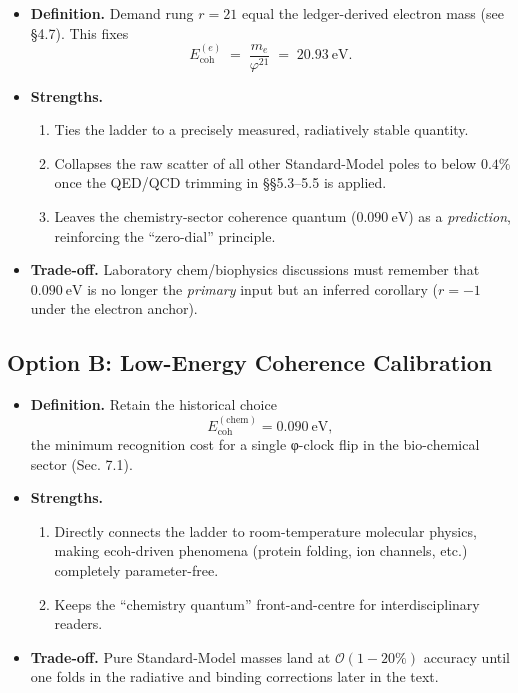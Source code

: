 \documentclass[11pt,oneside]{book}
\begin{document}
\begin{itemize}
\item \textbf{Definition.}  Demand rung $r=21$ equal the ledger-derived electron mass
      (see §4.7).  
      This fixes
      \[
        E_{\mathrm{coh}}^{(e)} \;=\;
        \frac{m_{e}}{\varphi^{21}} \;=\; 20.93\ \mathrm{eV}.
      \]
\item \textbf{Strengths.}  
  \begin{enumerate}
  \item Ties the ladder to a precisely measured, radiatively stable quantity.  
  \item Collapses the raw scatter of all other Standard-Model poles to below
        $0.4\%$ once the QED/QCD trimming in §§5.3–5.5 is applied.  
  \item Leaves the chemistry-sector coherence quantum ($0.090\ \mathrm{eV}$) as a
        \emph{prediction}, reinforcing the “zero-dial” principle.
  \end{enumerate}
\item \textbf{Trade-off.}  Laboratory chem/biophysics discussions must remember that
      $0.090\ \mathrm{eV}$ is no longer the \emph{primary} input but an inferred corollary
      ($r=-1$ under the electron anchor).
\end{itemize}

\subsection*{Option B: Low-Energy Coherence Calibration}

\begin{itemize}
\item \textbf{Definition.}  Retain the historical choice
      \[
        E_{\mathrm{coh}}^{(\text{chem})}=0.090\ \mathrm{eV},
      \]
      the minimum recognition cost for a single φ-clock flip in the bio-chemical
      sector (Sec. 7.1).
\item \textbf{Strengths.}
  \begin{enumerate}
  \item Directly connects the ladder to room-temperature molecular physics,
        making ecoh-driven phenomena (protein folding, ion channels, etc.)
        completely parameter-free.  
  \item Keeps the “chemistry quantum” front-and-centre for interdisciplinary
        readers.
  \end{enumerate}
\item \textbf{Trade-off.}  Pure Standard-Model masses land at
      $\mathcal{O}(1\!-\!20\%)$ accuracy until one folds in the radiative and binding
      corrections later in the text.
\end{itemize}
\end{document}

